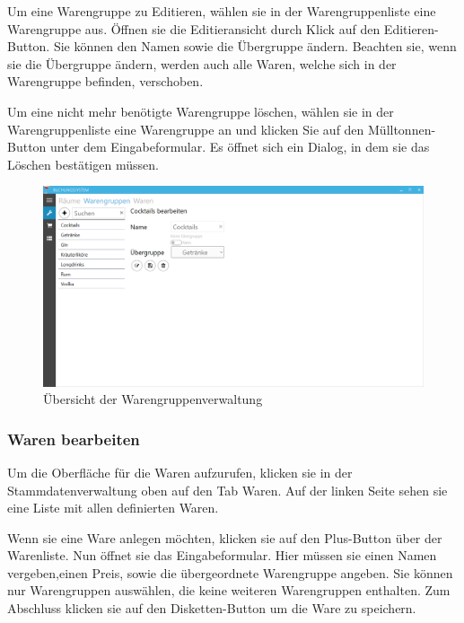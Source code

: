 Um eine Warengruppe zu Editieren, wählen sie in der Warengruppenliste eine Warengruppe aus. Öffnen sie die Editieransicht durch Klick auf den Editieren-Button.
Sie können den Namen sowie die Übergruppe ändern. Beachten sie, wenn sie die Übergruppe ändern, werden auch alle Waren, welche sich in der Warengruppe befinden, verschoben.

Um eine nicht mehr benötigte Warengruppe löschen, wählen sie in der Warengruppenliste eine Warengruppe an und klicken Sie auf den Mülltonnen-Button unter dem Eingabeformular. Es öffnet sich ein Dialog, in dem sie das Löschen bestätigen müssen.

\begin{figure}[h]
	\begin{center}
		\includegraphics[width=\columnwidth]{Benutzerhandbuch/Warengruppenverwaltung.png}
	\end{center}
	\caption{Übersicht der Warengruppenverwaltung}
	\label{fig:productgroup-management}
\end{figure}

\subsubsection{Waren bearbeiten}

Um die Oberfläche für die Waren aufzurufen, klicken sie in der Stammdatenverwaltung oben auf den Tab Waren. Auf der linken Seite sehen sie eine Liste mit allen definierten Waren. 

Wenn sie eine Ware anlegen möchten, klicken sie auf den Plus-Button über der Warenliste. Nun öffnet sie das Eingabeformular. Hier müssen sie einen Namen vergeben,einen Preis, sowie die übergeordnete Warengruppe angeben. 
Sie können nur Warengruppen auswählen, die keine weiteren Warengruppen enthalten.
Zum Abschluss klicken sie auf den Disketten-Button um die Ware zu speichern.

